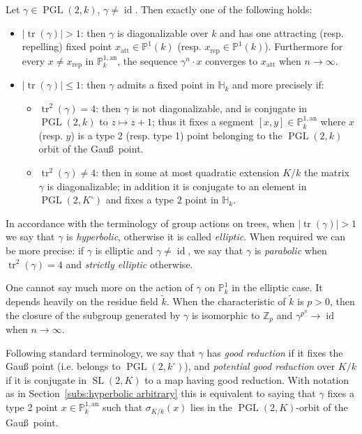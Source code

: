 \documentclass[10pt]{amsart}
\theoremstyle{definition}\newtheorem{defi}[theo]{Definition}\newtheorem{rema}[theo]{Remark}\newtheorem{exam}[theo]{Example}\newtheorem{exem}[theo]{Example}\newtheorem{nota}[theo]{Notation}
\DeclareMathOperator{\tr}{tr}
\DeclareMathOperator{\id}{id}
\DeclareMathOperator{\SL}{SL}
\DeclareMathOperator{\PGL}{PGL}
\newcommand{\hh}{\mathbb{H}}
\newcommand{\Z}{{\mathbb Z}}
\newcommand{\an}{\mathrm{an}}
\newcommand{\PP}{\mathbb{P}}
\newcommand{\att}{\mathrm{att}}
\newcommand{\rep}{\mathrm{rep}}
\begin{document}
\begin{prop}\label{prop:claselt}
Let $\gamma\in \PGL(2,k)$, $\gamma\neq \id$. Then exactly one of the following holds:
\begin{itemize}
\item $\mathopen{|}\tr(\gamma)| >1$: then $\gamma$ is diagonalizable over $k$ and has one attracting (resp. repelling) fixed point $x_\att \in \PP^1(k)$ (resp. $x_\rep \in \PP^1(k)$). Furthermore for every $x\neq x_\rep$ in $\PP^{1,\an}_k$, the sequence $\gamma^n\cdot x $ converges to $ x_\att$ when $n\to\infty$.
\item $\mathopen{|}\tr(\gamma)| \leq 1$: then $\gamma$ admits a fixed point in $\hh_k$ and more precisely if:
\begin{itemize}
\item $\tr^2(\gamma) =4$: then $\gamma$ is not diagonalizable, and is conjugate in $\PGL(2,k)$ to $z\mapsto z+1$; thus it fixes a segment $[x,y] \in \PP^{1,\an}_k$ where $x$ (resp. $y$) is a type 2 (resp. type 1) point belonging to the $\PGL(2,k)$ orbit of the Gau\ss\ point.
\item $\tr^2(\gamma) \neq 4$: then in some at most quadratic extension $K/k$ the matrix $\gamma$ is diagonalizable; in addition it is conjugate to an element in $\PGL(2,K^\circ)$ and fixes a type $2$ point in $\hh_k$.
\end{itemize}
\end{itemize}
\end{prop}

In accordance with the terminology of group actions on trees, when $\mathopen{|}\tr(\gamma)| >1$ we say that $\gamma$ is \emph{hyperbolic}, otherwise it is called \emph{elliptic}. When required we can be more precise: if $\gamma$ is elliptic and $\gamma\neq \id$, we say that $\gamma$ is \emph{parabolic} when $\tr^2(\gamma) =4$ and \emph{strictly elliptic} otherwise.


One cannot say much more on the action of $\gamma$ on $\PP^1_k$ in the elliptic case. It depends heavily on the residue field $\widetilde{k}$. When the characteristic of $\widetilde{k}$ is $p>0$, then the closure of the subgroup generated by $\gamma$ is isomorphic to $\Z_p$ and $\gamma^{p^n} \to \id$ when $n\to\infty$.


Following standard terminology, we say that $\gamma$ has \emph{good reduction} if it fixes the Gau{\ss} point (i.e. belongs to $\PGL(2,k^\circ)$), and \emph{potential good reduction} over $K/k$ if it is conjugate in $\SL(2,K)$ to a map having good reduction. With notation as in Section~\ref{subs:hyperbolic arbitrary} this is equivalent to saying that $\gamma$ fixes a type 2 point $x\in \PP^{1,\an}_k$ such that $\sigma_{K/k}(x)$ lies in the $\PGL(2,K)$-orbit of the Gau\ss\ point.
\end{document}
